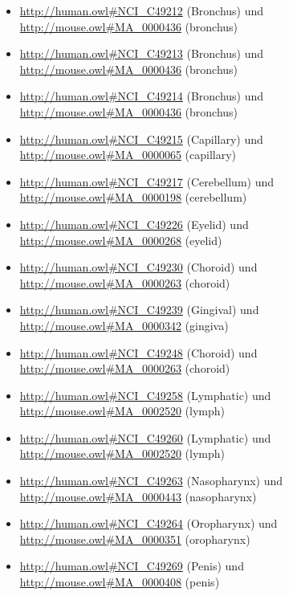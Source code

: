 \begin{itemize}
	\item \url{http://human.owl#NCI_C49212} (Bronchus\textunderscoreLamina\textunderscorePropria) und \url{http://mouse.owl#MA_0000436} (bronchus)
	\item \url{http://human.owl#NCI_C49213} (Bronchus\textunderscoreSmooth\textunderscoreMuscle\textunderscoreTissue) und \url{http://mouse.owl#MA_0000436} (bronchus)
	\item \url{http://human.owl#NCI_C49214} (Bronchus\textunderscoreSubmucosa) und \url{http://mouse.owl#MA_0000436} (bronchus)
	\item \url{http://human.owl#NCI_C49215} (Capillary\textunderscoreEndothelium) und \url{http://mouse.owl#MA_0000065} (capillary)
	\item \url{http://human.owl#NCI_C49217} (Cerebellum\textunderscoreWhite\textunderscoreMatter) und \url{http://mouse.owl#MA_0000198} (cerebellum)
	\item \url{http://human.owl#NCI_C49226} (Eyelid\textunderscoreSubcutaneous\textunderscoreConnective\textunderscoreTissue) und \url{http://mouse.owl#MA_0000268} (eyelid)
	\item \url{http://human.owl#NCI_C49230} (Choroid\textunderscorePlexus\textunderscoreEpithelium\textunderscoreof\textunderscorethe\textunderscoreFourth\textunderscoreVentricle) und \url{http://mouse.owl#MA_0000263} (choroid)
	\item \url{http://human.owl#NCI_C49239} (Gingival\textunderscoreEpithelium) und \url{http://mouse.owl#MA_0000342} (gingiva)
	\item \url{http://human.owl#NCI_C49248} (Choroid\textunderscorePlexus\textunderscoreEpithelium\textunderscoreof\textunderscorethe\textunderscoreLateral\textunderscoreVentricle) und \url{http://mouse.owl#MA_0000263} (choroid)
	\item \url{http://human.owl#NCI_C49258} (Lymphatic\textunderscoreVessel\textunderscoreEndothelium) und \url{http://mouse.owl#MA_0002520} (lymph)
	\item \url{http://human.owl#NCI_C49260} (Lymphatic\textunderscoreVessel\textunderscoreSmooth\textunderscoreMuscle\textunderscoreTissue) und \url{http://mouse.owl#MA_0002520} (lymph)
	\item \url{http://human.owl#NCI_C49263} (Nasopharynx\textunderscoreEpithelium) und \url{http://mouse.owl#MA_0000443} (nasopharynx)
	\item \url{http://human.owl#NCI_C49264} (Oropharynx\textunderscoreEpithelium) und \url{http://mouse.owl#MA_0000351} (oropharynx)
	\item \url{http://human.owl#NCI_C49269} (Penis\textunderscoreErectile\textunderscoreTissue) und \url{http://mouse.owl#MA_0000408} (penis)

\end{itemize}
